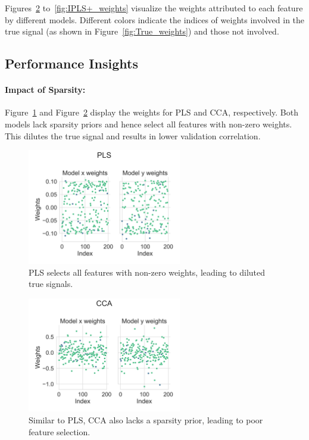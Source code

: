 Figures~\ref{fig:CCA_weights} to~\ref{fig:IPLS+_weights} visualize the weights attributed to each feature by different models.
Different colors indicate the indices of weights involved in the true signal (as shown in Figure~\ref{fig:True_weights}) and those not involved.

\subsection{Performance Insights}

\paragraph{Impact of Sparsity:}
Figure~\ref{fig:PLS_weights} and Figure~\ref{fig:CCA_weights} display the weights for PLS and CCA, respectively.
Both models lack sparsity priors and hence select all features with non-zero weights.
This dilutes the true signal and results in lower validation correlation.

\begin{figure}[h]
    \centering
    \includegraphics[width=0.6\textwidth]{figures/als/simulated/PLS_weights.svg}
    \caption{PLS selects all features with non-zero weights, leading to diluted true signals.}
    \label{fig:PLS_weights}
\end{figure}

\begin{figure}[h]
    \centering
    \includegraphics[width=0.6\textwidth]{figures/als/simulated/CCA_weights.svg}
    \caption{ Similar to PLS, CCA also lacks a sparsity prior, leading to poor feature selection.}
    \label{fig:CCA_weights}
\end{figure}

